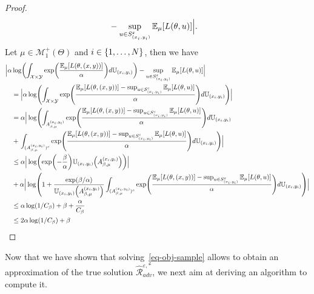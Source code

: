 \begin{proof}
\begin{align*}
 &-\sup_{u\in S^{\varepsilon}_{(x_i,y_i)}}\mathbb{E}_{\mu}[L(\theta,u)] \Big|.
\end{align*}
Let $\mu\in\mathcal{M}_1^{+}(\Theta)$ and $i\in\{1,\dots,N\}$, then we have
\begin{align*}
 \Big|\alpha&\log\left(\int_{\mathcal{X}\times\mathcal{Y}}\exp\left(\frac{\mathbb{E}_{\mu}[\loss(\theta,(x,y))]}{\alpha} \right) d\mathbb{U}_{(x_i,y_i)}\right)-\sup_{u\in S^{\varepsilon}_{(x_i,y_i)}}\mathbb{E}_{\mu}[\loss(\theta,u)] \Big|\\
 &=\Big|\alpha\log\left(\int_{\mathcal{X}\times\mathcal{Y}}\exp\left(\frac{\mathbb{E}_{\mu}[\loss(\theta,(x,y))]-\sup_{u\in S^{\varepsilon}_{(x_i,y_i)}}\mathbb{E}_{\mu}[\loss(\theta,u)]}{\alpha} \right) d\mathbb{U}_{(x_i,y_i)}\right) \Big|  \\
 &=\alpha  \Big| \log\left(\int_{A_{\beta,\mu}^{(x_i,y_i)}}\exp\left(\frac{\mathbb{E}_{\mu}[\loss(\theta,(x,y))]-\sup_{u\in S^{\varepsilon}_{(x_i,y_i)}}\mathbb{E}_{\mu}[\loss(\theta,u)]}{\alpha} \right) d\mathbb{U}_{(x_i,y_i)}\right. \\
 &+ \left.\int_{(A_{\beta,\mu}^{(x_i,y_i)})^{c}}\exp\left(\frac{\mathbb{E}_{\mu}[\loss(\theta,(x,y))]-\sup_{u\in S^{\varepsilon}_{(x_i,y_i)}}\mathbb{E}_{\mu}[\loss(\theta,u)]}{\alpha} \right) d\mathbb{U}_{(x_i,y_i)}\right)  \Big|\\
 &\leq \alpha \Big | \log\left(\exp(-\frac\beta\alpha)\mathbb{U}_{(x_i,y_i)}\left(A_{\beta,\mu}^{(x_i,y_i)}\right) \right)\Big | \\
 &+ \alpha  \Big|\log\left(1+ \frac{\exp(\beta/\alpha)}{\mathbb{U}_{(x_i,y_i)}\left(A_{\beta,\mu}^{(x_i,y_i)}\right)}\int_{(A_{\beta,\mu}^{(x_i,y_i)})^{c}}\exp\left(\frac{\mathbb{E}_{\mu}[\loss(\theta,(x,y))]-\sup_{u\in S^{\varepsilon}_{(x_i,y_i)}}\mathbb{E}_{\mu}[\loss(\theta,u)]}{\alpha} \right) d\mathbb{U}_{(x_i,y_i)}\right)  \Big|\\
 &\leq \alpha\log(1/C_\beta)+\beta +\frac{\alpha}{C_\beta}\\
 &\leq 2\alpha\log(1/C_\beta)+\beta
\end{align*}
\end{proof}



Now that we have shown that solving~\eqref{eq-obj-sample} allows to obtain an approximation of the true solution $\widehat{\mathcal{R}}_{adv}^{\varepsilon,*}$, we next aim at deriving an algorithm to compute it. 

